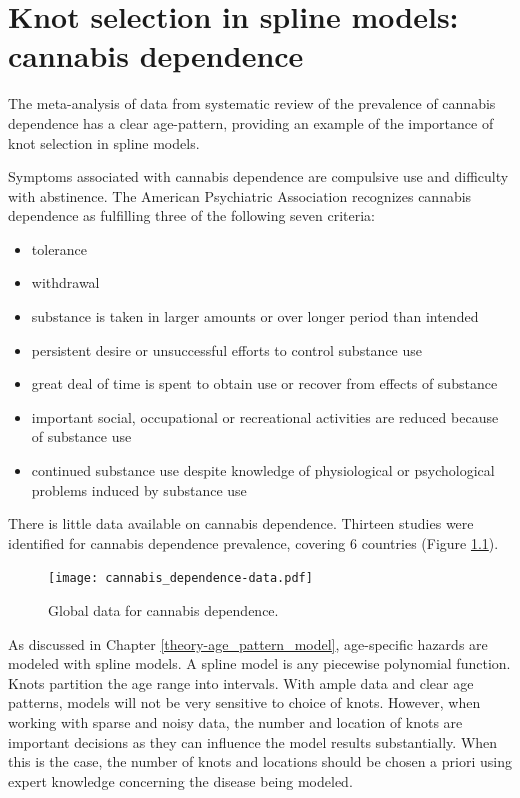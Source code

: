 \chapter{Knot selection in spline models: cannabis dependence}
\label{applications-splines_knot_loc}

The meta-analysis of data from systematic review of the prevalence of cannabis dependence has a clear age-pattern, providing an example of the importance of knot selection in spline models.

Symptoms associated with cannabis dependence are compulsive use and difficulty with abstinence.  The American Psychiatric Association recognizes cannabis dependence as fulfilling three of the following seven criteria:
    \begin{itemize}
        \item tolerance
        \item withdrawal
        \item substance is taken in larger amounts or over longer period than intended
        \item persistent desire or unsuccessful efforts to control substance use
        \item great deal of time is spent to obtain use or recover from effects of substance
        \item important social, occupational or recreational activities are reduced because of substance use
        \item continued substance use despite knowledge of physiological or psychological problems induced by substance use \cite{american_diagnostic_2000, coffey_cannabis_2002}
    \end{itemize}

There is little data available on cannabis dependence.  Thirteen studies were identified for cannabis dependence prevalence, covering 6 countries (Figure \ref{fig:app-cannabis_data}).

    \begin{figure}[h]
        \begin{center}
            \texttt{[image: cannabis\_dependence-data.pdf]}
            \caption{Global data for cannabis dependence.}
            \label{fig:app-cannabis_data}
        \end{center}
    \end{figure}

As discussed in Chapter \ref{theory-age_pattern_model}, age-specific hazards are modeled with spline models.  A spline model is any piecewise polynomial function.  Knots partition the age range into intervals.  With ample data and clear age patterns, models will not be very sensitive to choice of knots.  However, when working with sparse and noisy data, the number and location of knots are important decisions as they can influence the model results substantially.  When this is the case, the number of knots and locations should be chosen a priori using expert knowledge concerning the disease being modeled.

